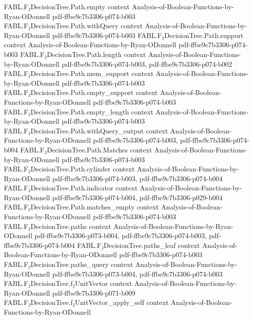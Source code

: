 \begin{theorem}
\proofstep
  {FABL.F₂DecisionTree.Path.empty}
  {context}
  {Analysis-of-Boolean-Functions-by-Ryan-ODonnell}
  {pdf-ffbe9c7b3306-p074-b003}
\proofstep
  {FABL.F₂DecisionTree.Path.withQuery}
  {context}
  {Analysis-of-Boolean-Functions-by-Ryan-ODonnell}
  {pdf-ffbe9c7b3306-p074-b003}
\proofstep
  {FABL.F₂DecisionTree.Path.support}
  {context}
  {Analysis-of-Boolean-Functions-by-Ryan-ODonnell}
  {pdf-ffbe9c7b3306-p074-b003}
\proofstep
  {FABL.F₂DecisionTree.Path.length}
  {context}
  {Analysis-of-Boolean-Functions-by-Ryan-ODonnell}
  {pdf-ffbe9c7b3306-p074-b003,
    pdf-ffbe9c7b3306-p074-b002}
\proofstep
  {FABL.F₂DecisionTree.Path.mem_support}
  {context}
  {Analysis-of-Boolean-Functions-by-Ryan-ODonnell}
  {pdf-ffbe9c7b3306-p074-b003}
\proofstep
  {FABL.F₂DecisionTree.Path.empty_support}
  {context}
  {Analysis-of-Boolean-Functions-by-Ryan-ODonnell}
  {pdf-ffbe9c7b3306-p074-b003}
\proofstep
  {FABL.F₂DecisionTree.Path.empty_length}
  {context}
  {Analysis-of-Boolean-Functions-by-Ryan-ODonnell}
  {pdf-ffbe9c7b3306-p074-b003}
\proofstep
  {FABL.F₂DecisionTree.Path.withQuery_output}
  {context}
  {Analysis-of-Boolean-Functions-by-Ryan-ODonnell}
  {pdf-ffbe9c7b3306-p074-b003,
    pdf-ffbe9c7b3306-p074-b004}
\proofstep
  {FABL.F₂DecisionTree.Path.Matches}
  {context}
  {Analysis-of-Boolean-Functions-by-Ryan-ODonnell}
  {pdf-ffbe9c7b3306-p074-b003}
\proofstep
  {FABL.F₂DecisionTree.Path.cylinder}
  {context}
  {Analysis-of-Boolean-Functions-by-Ryan-ODonnell}
  {pdf-ffbe9c7b3306-p074-b003,
    pdf-ffbe9c7b3306-p074-b004}
\proofstep
  {FABL.F₂DecisionTree.Path.indicator}
  {context}
  {Analysis-of-Boolean-Functions-by-Ryan-ODonnell}
  {pdf-ffbe9c7b3306-p074-b004,
    pdf-ffbe9c7b3306-p029-b004}
\proofstep
  {FABL.F₂DecisionTree.Path.matches_empty}
  {context}
  {Analysis-of-Boolean-Functions-by-Ryan-ODonnell}
  {pdf-ffbe9c7b3306-p074-b003}
\proofstep
  {FABL.F₂DecisionTree.paths}
  {context}
  {Analysis-of-Boolean-Functions-by-Ryan-ODonnell}
  {pdf-ffbe9c7b3306-p073-b004,
    pdf-ffbe9c7b3306-p074-b003,
    pdf-ffbe9c7b3306-p074-b004}
\proofstep
  {FABL.F₂DecisionTree.paths_leaf}
  {context}
  {Analysis-of-Boolean-Functions-by-Ryan-ODonnell}
  {pdf-ffbe9c7b3306-p074-b003}
\proofstep
  {FABL.F₂DecisionTree.paths_query}
  {context}
  {Analysis-of-Boolean-Functions-by-Ryan-ODonnell}
  {pdf-ffbe9c7b3306-p073-b004,
    pdf-ffbe9c7b3306-p074-b003}
\proofstep
  {FABL.F₂DecisionTree.f₂UnitVector}
  {context}
  {Analysis-of-Boolean-Functions-by-Ryan-ODonnell}
  {pdf-ffbe9c7b3306-p071-b009}
\proofstep
  {FABL.F₂DecisionTree.f₂UnitVector_apply_self}
  {context}
  {Analysis-of-Boolean-Functions-by-Ryan-ODonnell}

\end{theorem}

